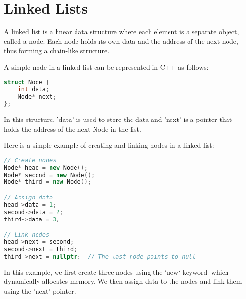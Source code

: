 \chapter{Linked Lists}


A linked list is a linear data structure where each element is a separate object, called a node. Each node holds its own data and the address of the next node, thus forming a chain-like structure.

A simple node in a linked list can be represented in C++ as follows:

\begin{lstlisting}[language=C++]
struct Node {
    int data;
    Node* next;
};
\end{lstlisting}

In this structure, 'data' is used to store the data and 'next' is a pointer that holds the address of the next Node in the list.

Here is a simple example of creating and linking nodes in a linked list:

\begin{lstlisting}[language=C++]
// Create nodes
Node* head = new Node();
Node* second = new Node();
Node* third = new Node();

// Assign data
head->data = 1;
second->data = 2;
third->data = 3;

// Link nodes
head->next = second;
second->next = third;
third->next = nullptr;  // The last node points to null
\end{lstlisting}

In this example, we first create three nodes using the `new` keyword, which dynamically allocates memory. We then assign data to the nodes and link them using the 'next' pointer.
